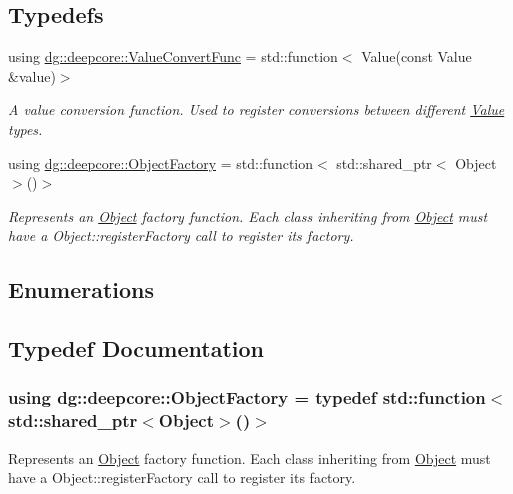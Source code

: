 \subsection*{Typedefs}
\begin{DoxyCompactItemize}
\item 
using \hyperlink{group___process_type_ga213a2a633d6658f67842bd2958c82c78}{dg\+::deepcore\+::\+Value\+Convert\+Func} = std\+::function$<$ Value(const Value \&value)$>$
\begin{DoxyCompactList}\small\item\em A value conversion function. Used to register conversions between different \hyperlink{classdg_1_1deepcore_1_1_value}{Value} types. \end{DoxyCompactList}\item 
using \hyperlink{group___process_type_ga31f9e496107d11d745b3b405d38f0e64}{dg\+::deepcore\+::\+Object\+Factory} = std\+::function$<$ std\+::shared\+\_\+ptr$<$ Object $>$()$>$
\begin{DoxyCompactList}\small\item\em Represents an \hyperlink{classdg_1_1deepcore_1_1_object}{Object} factory function. Each class inheriting from \hyperlink{classdg_1_1deepcore_1_1_object}{Object} must have a Object\+::register\+Factory call to register its factory. \end{DoxyCompactList}\end{DoxyCompactItemize}
\subsection*{Enumerations}


\subsection{Typedef Documentation}
\subsubsection[{\texorpdfstring{Object\+Factory}{ObjectFactory}}]{\setlength{\rightskip}{0pt plus 5cm}using {\bf dg\+::deepcore\+::\+Object\+Factory} = typedef std\+::function$<$std\+::shared\+\_\+ptr$<$Object$>$()$>$}\hypertarget{group___process_type_ga31f9e496107d11d745b3b405d38f0e64}{}\label{group___process_type_ga31f9e496107d11d745b3b405d38f0e64}


Represents an \hyperlink{classdg_1_1deepcore_1_1_object}{Object} factory function. Each class inheriting from \hyperlink{classdg_1_1deepcore_1_1_object}{Object} must have a Object\+::register\+Factory call to register its factory. 


